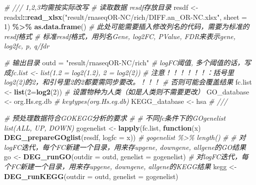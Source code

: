 \documentclass[
]{book}
\newenvironment{Shaded}{\begin{snugshade}}{\end{snugshade}}
\newcommand{\AttributeTok}[1]{\textcolor[rgb]{0.13,0.29,0.53}{#1}}
\newcommand{\CommentTok}[1]{\textcolor[rgb]{0.56,0.35,0.01}{\textit{#1}}}
\newcommand{\ControlFlowTok}[1]{\textcolor[rgb]{0.13,0.29,0.53}{\textbf{#1}}}
\newcommand{\DecValTok}[1]{\textcolor[rgb]{0.00,0.00,0.81}{#1}}
\newcommand{\FunctionTok}[1]{\textcolor[rgb]{0.13,0.29,0.53}{\textbf{#1}}}
\newcommand{\NormalTok}[1]{#1}
\newcommand{\OtherTok}[1]{\textcolor[rgb]{0.56,0.35,0.01}{#1}}
\newcommand{\SpecialCharTok}[1]{\textcolor[rgb]{0.81,0.36,0.00}{\textbf{#1}}}
\newcommand{\StringTok}[1]{\textcolor[rgb]{0.31,0.60,0.02}{#1}}
\begin{document}
\begin{Shaded}
\begin{Highlighting}[]
\CommentTok{\# /// 1,2,3均需按实际改写}
\CommentTok{\# 读取数据  resdf存放目录}
\NormalTok{resdf }\OtherTok{\textless{}{-}}\NormalTok{ readxl}\SpecialCharTok{::}\FunctionTok{read\_xlsx}\NormalTok{(}\StringTok{"result/rnaseqOR{-}NC/rich/DIFF.an\_OR{-}NC.xlsx"}\NormalTok{,}
                  \AttributeTok{sheet =} \DecValTok{1}\NormalTok{) }\SpecialCharTok{\%\textgreater{}\%} \FunctionTok{as.data.frame}\NormalTok{()}
\CommentTok{\# 此处可能需要插入修改列名的代码，需要为标准的resdf格式}
\CommentTok{\#   标准resdf格式，用列名Gene, log2FC, PValue, FDR来表示gene, log2fc, p, q/fdr}

\CommentTok{\# 输出目录}
\NormalTok{outd }\OtherTok{=} \StringTok{"result/rnaseqOR{-}NC/rich"} 
\CommentTok{\# logFC阈值, 多个阈值的话，写成fc.list \textless{}{-} list(\textquotesingle{}1.2\textquotesingle{} = log2(1.2), \textquotesingle{}2\textquotesingle{} = log2(2))}
\CommentTok{\# 注意！！！！！！：括号里log2(2)的2，和引号里\textquotesingle{}2\textquotesingle{}的2都要需同步要改。！！！}
\CommentTok{\# 否则可能会覆盖结果}
\NormalTok{fc.list }\OtherTok{\textless{}{-}} \FunctionTok{list}\NormalTok{(}\StringTok{\textquotesingle{}2\textquotesingle{}}\OtherTok{=}\FunctionTok{log2}\NormalTok{(}\DecValTok{2}\NormalTok{))}
\CommentTok{\# 设置物种为人类（如是人类则不需要更改）}
\NormalTok{GO\_database }\OtherTok{\textless{}{-}} \StringTok{\textquotesingle{}org.Hs.eg.db\textquotesingle{}} \CommentTok{\# keytypes(org.Hs.eg.db)}
\NormalTok{KEGG\_database }\OtherTok{\textless{}{-}} \StringTok{\textquotesingle{}hsa\textquotesingle{}} 
\CommentTok{\# ///}


\CommentTok{\# 预处理数据符合GOKEGG分析的要求}
\CommentTok{\# \# 不同fc条件下的GOgenelist list(ALL, UP, DOWN)}
\NormalTok{gogenelist }\OtherTok{\textless{}{-}} \FunctionTok{lapply}\NormalTok{(fc.list, }\ControlFlowTok{function}\NormalTok{(x) }\FunctionTok{DEG\_prepareGOglist}\NormalTok{(resdf, }\AttributeTok{logfc =}\NormalTok{ x))}
\CommentTok{\# gogenelist \%\textgreater{}\% length()}
\CommentTok{\#}
\CommentTok{\# 对logFC迭代，每个FC新建一个目录，用来存upgene, downgene, allgene的GO结果}
\NormalTok{go }\OtherTok{\textless{}{-}} \FunctionTok{DEG\_runGO}\NormalTok{(}\AttributeTok{outdir =}\NormalTok{ outd, }\AttributeTok{genelist =}\NormalTok{ gogenelist)}
\CommentTok{\# 对logFC迭代，每个FC新建一个目录，用来存upgene, downgene, allgene的KEGG结果}
\NormalTok{kegg }\OtherTok{\textless{}{-}} \FunctionTok{DEG\_runKEGG}\NormalTok{(}\AttributeTok{outdir =}\NormalTok{ outd, }\AttributeTok{genelist =}\NormalTok{ gogenelist)}
\end{Highlighting}
\end{Shaded}
\end{document}
